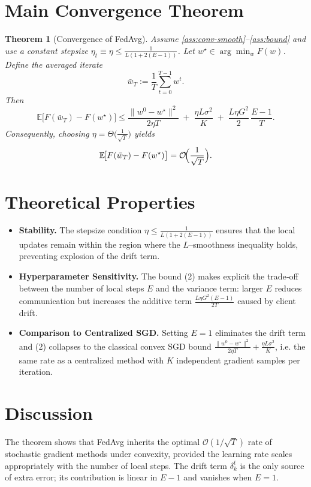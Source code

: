 \documentclass[11pt]{article}
\newtheorem{theorem}{Theorem}
\newcommand{\E}{\mathbb{E}}
\begin{document}
\section*{Main Convergence Theorem}
\begin{theorem}[Convergence of FedAvg]\label{thm:main}
Assume \ref{ass:conv-smooth}–\ref{ass:bound} and use a constant stepsize
$\eta_t\equiv\eta\le\frac{1}{L(1+2(E-1))}$.  
Let $w^\star\in\arg\min_{w}F(w)$.  
Define the averaged iterate
\[
\bar w_T:=\frac1T\sum_{t=0}^{T-1}w^{t}.
\]
Then
\[
\E\!\bigl[F(\bar w_T)-F(w^\star)\bigr]
\le
\frac{\|w^{0}-w^\star\|^{2}}{2\eta T}
\;+\;
\frac{\eta L\sigma^{2}}{K}
\;+\;
\frac{L\eta G^{2}}{2}\,\frac{E-1}{T}.
\tag{2}
\]
Consequently, choosing $\eta=\Theta\!\bigl(\frac{1}{\sqrt{T}}\bigr)$ yields
\[
\E\!\bigl[F(\bar w_T)-F(w^\star)\bigr]=\mathcal O\!\Bigl(\frac{1}{\sqrt{T}}\Bigr).
\]
\end{theorem}

\section*{Theoretical Properties}
\begin{itemize}
\item \textbf{Stability.} The stepsize condition $\eta\le\frac{1}{L(1+2(E-1))}$
ensures that the local updates remain within the region where the
$L$–smoothness inequality holds, preventing explosion of the drift term.
\item \textbf{Hyperparameter Sensitivity.} The bound (2) makes explicit
the trade‑off between the number of local steps $E$ and the variance term:
larger $E$ reduces communication but increases the additive term
$\frac{L\eta G^{2}(E-1)}{2T}$ caused by client drift.
\item \textbf{Comparison to Centralized SGD.}
Setting $E=1$ eliminates the drift term and (2) collapses to the classical
convex SGD bound $\frac{\|w^{0}-w^\star\|^{2}}{2\eta T}
+\frac{\eta L\sigma^{2}}{K}$, i.e. the same rate as a centralized method
with $K$ independent gradient samples per iteration.
\end{itemize}

\section*{Discussion}
The theorem shows that FedAvg inherits the optimal $\mathcal O(1/\sqrt{T})$
rate of stochastic gradient methods under convexity, provided the learning
rate scales appropriately with the number of local steps.  The drift term
$\delta_{k}^{t}$ is the only source of extra error; its contribution is
linear in $E-1$ and vanishes when $E=1$.
\end{document}
